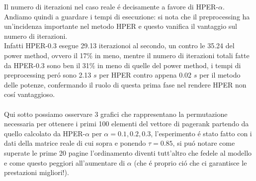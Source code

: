 \documentclass[12pt,a4paper]{amsart}
\numberwithin{equation}{section}
\theoremstyle{plain}
\theoremstyle{definition}
\begin{document}
Il numero di iterazioni nel caso reale \'e decisamente a favore di HPER-$\alpha$. Andiamo quindi a guardare i tempi di esecuzione: si nota che il preprocessing ha un'incidenza importante nel metodo HPER e questo vanifica il vantaggio sul numero di iterazioni.\\
Infatti HPER-0.3 esegue 29.13 iterazionoi al secondo, un contro le 35.24 del power method, ovvero il 17$\%$ in meno, mentre il numero di iterazioni totali fatte da HPER-0.3 sono ben il 31$\%$ in meno di quelle del power method, i tempi di preprocessing per\'o sono 2.13 $s$ per HPER contro appena 0.02 $s$ per il metodo delle potenze, confermando il ruolo di questa prima fase nel rendere HPER non cos\'i vantaggioso.\\
\\
Qui sotto possiamo osservare 3 grafici che rappresentano la permutazione necessaria per ottenere i primi 100 elementi del vettore di pagerank partendo da quello calcolato da HPER-$\alpha$ per $\alpha=0.1, 0.2, 0.3$, l'esperimento \'e stato fatto con i dati della matrice reale di cui sopra e ponendo $\tau = 0.85$, si pu\'o notare come superate le prime 20 pagine l'ordinamento diventi tutt'altro che fedele al modello e come questo peggiori all'aumentare di $\alpha$ (che \'e proprio ci\'o che ci garantisce le prestazioni migliori!).\\
\end{document}
